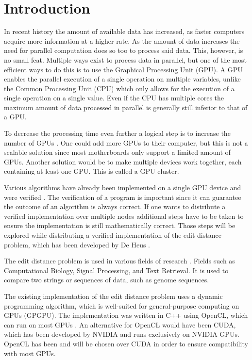 \section{Introduction}
In recent history the amount of available data has increased, as faster computers acquire more information at a higher rate.
As the amount of data increases the need for parallel computation does so too to process said data.
This, however, is no small feat.
Multiple ways exist to process data in parallel, but one of the most efficient ways to do this is to use the Graphical Processing Unit (GPU).
A GPU enables the parallel execution of a single operation on multiple variables, unlike the Common Processing Unit (CPU) which only allows for the execution of a single operation on a single value.
Even if the CPU has multiple cores the maximum amount of data processed in parallel is generally still inferior to that of a GPU.

To decrease the processing time even further a logical step is to increase the number of GPUs \cite{Cluster}.
One could add more GPUs to their computer, but this is not a scalable solution since most motherboards only support a limited amount of GPUs.
Another solution would be to make multiple devices work together, each containing at least one GPU.
This is called a GPU cluster.

Various algorithms have already been implemented on a single GPU device and were verified \cite{Heus}.
The verification of a program is important since it can guarantee the outcome of an algorithm is always correct.
If one wants to distribute a verified implementation over multiple nodes additional steps have to be taken to ensure the implementation is still mathematically correct.
Those steps will be explored while distributing a verified implementation of the edit distance problem, which has been developed by De Heus \cite{Heus}.

The edit distance problem is used in various fields of research \cite{Navarro:2001:GTA:375360.375365}.
Fields such as Computational Biology, Signal Processing, and Text Retrieval.
It is used to compare two strings or sequences of data, such as genome sequences.

The existing implementation of the edit distance problem uses a dynamic programming algorithm, which is well-suited for general-purpose computing on GPUs (GPGPU).
The implementation was written in C++ using OpenCL, which can run on most GPUs \cite{Kronos:conformant}.
An alternative for OpenCL would have been CUDA, which has been developed by NVIDIA and runs exclusively on NVIDIA GPUs.
OpenCL has been and will be chosen over CUDA in order to ensure compatibility with most GPUs.

